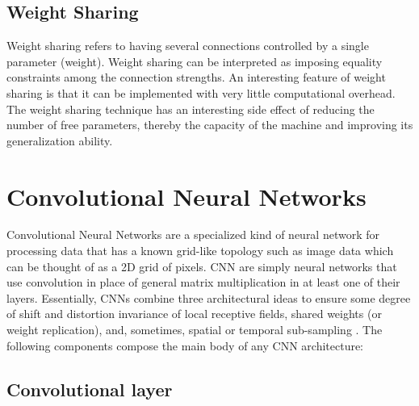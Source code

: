 \subsection{Weight Sharing}
Weight sharing refers to having several connections controlled by a single parameter (weight). Weight sharing can be interpreted as imposing equality constraints among the connection strengths. An interesting feature of weight sharing is that it can be implemented with very little computational overhead\cite{lecun1989generalization}. The weight sharing technique has an interesting side effect of reducing the number of free parameters, thereby the capacity of the machine and improving its generalization ability\cite{lecun2010convolutional}.

\section{Convolutional Neural Networks}
\label{sec:cnn}
Convolutional Neural Networks are a specialized kind of neural network for processing data that has a known grid-like topology such as image data which can be thought of as a 2D grid of pixels. CNN are simply neural networks that use convolution in place of general matrix multiplication in at least one of their layers\cite{Goodfellow-et-al-2016-Book}. 
Essentially, CNNs combine three architectural ideas to ensure some degree of shift and distortion invariance of local receptive fields, shared weights (or weight replication), and, sometimes, spatial or temporal sub-sampling\cite{lecun2010convolutional} . 
The following components compose the main body of any CNN architecture:

\subsection{Convolutional layer} 

